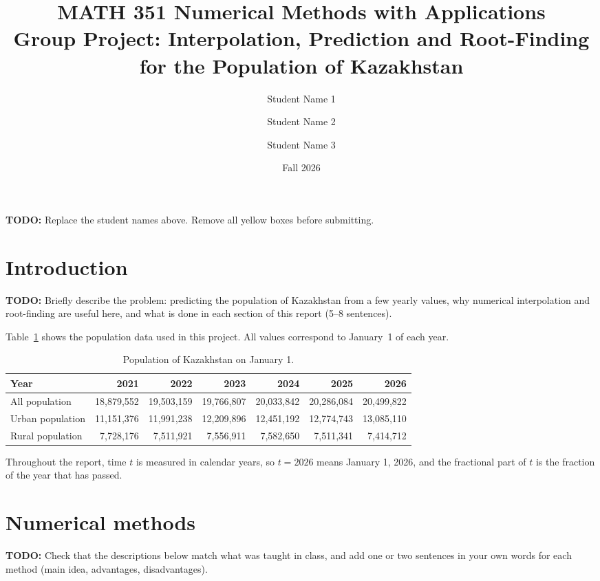 \documentclass[11pt,a4paper]{article}
\title{\textbf{MATH 351 Numerical Methods with Applications}\\[4pt]
Group Project: Interpolation, Prediction and Root-Finding\\
for the Population of Kazakhstan}
\author{Student Name 1 \and Student Name 2 \and Student Name 3}
\date{Fall 2026}
\newcommand{\TODO}[1]{\par\smallskip\noindent\colorbox{yellow!35}{%
  \parbox{\dimexpr\linewidth-2\fboxsep}{\small\textbf{TODO:} #1}}\par\smallskip}
\begin{document}
\maketitle

\TODO{Replace the student names above. Remove all yellow boxes before submitting.}

\tableofcontents
\newpage

\section{Introduction}
\TODO{Briefly describe the problem: predicting the population of Kazakhstan from a
few yearly values, why numerical interpolation and root-finding are useful here, and
what is done in each section of this report (5--8 sentences).}

Table~\ref{tab:data} shows the population data used in this project. All values
correspond to January~1 of each year.

\begin{table}[H]
\centering
\caption{Population of Kazakhstan on January 1.}
\label{tab:data}
\small
\begin{tabular}{lrrrrrr}
\toprule
Year & 2021 & 2022 & 2023 & 2024 & 2025 & 2026 \\
\midrule
All population   & 18{,}879{,}552 & 19{,}503{,}159 & 19{,}766{,}807 & 20{,}033{,}842 & 20{,}286{,}084 & 20{,}499{,}822 \\
Urban population & 11{,}151{,}376 & 11{,}991{,}238 & 12{,}209{,}896 & 12{,}451{,}192 & 12{,}774{,}743 & 13{,}085{,}110 \\
Rural population &  7{,}728{,}176 &  7{,}511{,}921 &  7{,}556{,}911 &  7{,}582{,}650 &  7{,}511{,}341 &  7{,}414{,}712 \\
\bottomrule
\end{tabular}
\end{table}

Throughout the report, time $t$ is measured in calendar years, so $t=2026$ means
January 1, 2026, and the fractional part of $t$ is the fraction of the year that has
passed.

\section{Numerical methods}
\TODO{Check that the descriptions below match what was taught in class, and add one
or two sentences in your own words for each method (main idea, advantages,
disadvantages).}
\end{document}
